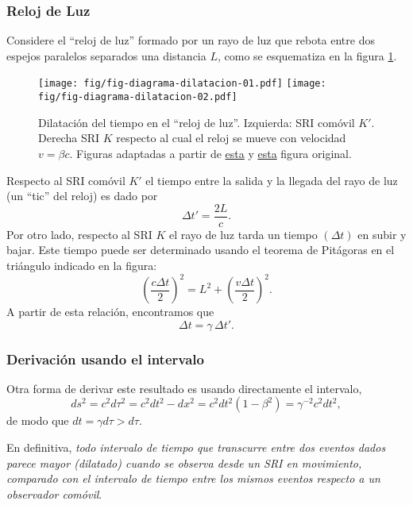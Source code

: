 \subsubsection{Reloj de Luz}
Considere el ``reloj de luz'' formado por un rayo de luz que rebota entre dos espejos paralelos separados una distancia $L$, como se esquematiza en la figura \ref{dt}.
\begin{figure}[!h]
\centerline{\texttt{[image: fig/fig-diagrama-dilatacion-01.pdf]}\hspace{1cm}
\texttt{[image: fig/fig-diagrama-dilatacion-02.pdf]}}
 \caption{Dilatación del tiempo en el ``reloj de luz''. Izquierda: SRI comóvil $K'$. Derecha SRI $K$ respecto al cual el reloj se mueve con velocidad $v=\beta c$. Figuras adaptadas a partir de \href{http://en.wikipedia.org/wiki/File:Time-dilation-001.svg}{esta} y \href{http://en.wikipedia.org/wiki/File:Time-dilation-002.svg}{esta} figura original.}
\label{dt}
\end{figure}
Respecto al SRI comóvil $K'$ el tiempo entre la salida y la llegada del rayo de luz (un ``tic'' del reloj) es dado por
\begin{equation}
\Delta t'=\frac{2L}{c}.
\end{equation}
Por otro lado, respecto al SRI $K$ el rayo de luz tarda un tiempo $(\Delta t)$ en subir y bajar. Este tiempo puede ser determinado usando el teorema de Pitágoras en el triángulo indicado en la figura:	
\begin{equation}
\left(\frac{c\Delta t}{2}\right)^2=L^2+\left(\frac{v\Delta t}{2}\right)^2.
\end{equation}
A partir de esta relación, encontramos que
\begin{equation}
\Delta t=\gamma\,\Delta t'.
\end{equation}

\subsubsection{Derivación usando el intervalo}

Otra forma de derivar este resultado es usando directamente el intervalo,
\begin{equation}
 ds^2=c^2d\tau^2=c^2dt^2-dx^2=c^2dt^2(1-\beta^2)=\gamma^{-2}c^2dt^2,
\end{equation}
de modo que $dt=\gamma d\tau>d\tau$.


En definitiva, \textit{todo intervalo de tiempo que transcurre entre dos eventos dados parece mayor (dilatado) cuando se observa desde un SRI en movimiento, comparado con el intervalo de tiempo entre los mismos eventos respecto a un observador comóvil}.


